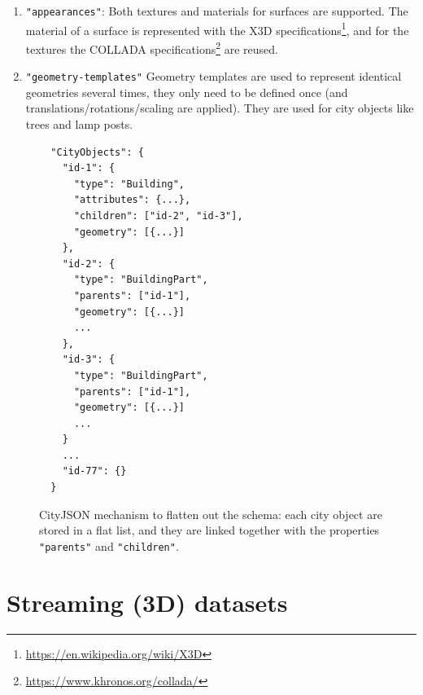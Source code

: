 \documentclass{isprs} %
\newcommand{\eg}{eg}
\begin{document}
\begin{enumerate}
  There are several advantages to this approach.
  First, the files can be compressed: 3D vertices are often shared by several surfaces, and repeating them can be costly (especially if they are very precise, often sub-millimetre is used).
  Second, this increases the topological relationships that are explicitly stored in the file, and several operations (\eg\ are 2 buildings adjacent?) can be sped up and made more robust.
  Third, it is very easy to convert to a representation listing all coordinates; the inverse is not true. 
  However, this is where the streaming of geometries is problematic: the array of "vertices" can for very large areas, contains several millions vertices.
  To be able to reconstruct one Building, all the \texttt{"vertices"} need to be in memory, which can be for streaming first waiting for millions of unused vertices to be transferred.
  \item \texttt{"appearances"}: Both textures and materials for surfaces are supported.  
  The material of a surface is represented with the X3D specifications\footnote{\url{https://en.wikipedia.org/wiki/X3D}}, and for the textures the COLLADA specifications\footnote{\url{https://www.khronos.org/collada/}} are reused.
  \item \texttt{"geometry-templates"} 
  Geometry templates are used to represent identical geometries several times, they only need to be defined once (and translations/rotations/scaling are applied). They are used for city objects like trees and lamp posts. 
\end{enumerate}


\begin{figure}
  \centering
\begin{lstlisting}
  "CityObjects": {
    "id-1": {
      "type": "Building",
      "attributes": {...},
      "children": ["id-2", "id-3"],
      "geometry": [{...}]
    },
    "id-2": {
      "type": "BuildingPart",
      "parents": ["id-1"],
      "geometry": [{...}]
      ...
    },
    "id-3": {
      "type": "BuildingPart",
      "parents": ["id-1"],
      "geometry": [{...}]
      ...
    }
    ...
    "id-77": {}
  }
\end{lstlisting}
  \caption{CityJSON mechanism to flatten out the schema: each city object are stored in a flat list, and they are linked together with the properties \texttt{"parents"} and \texttt{"children"}.}%
\label{fig:parents_children}
\end{figure}




%
\section{Streaming (3D) datasets}%
\label{sec:streaming}
\end{document}

